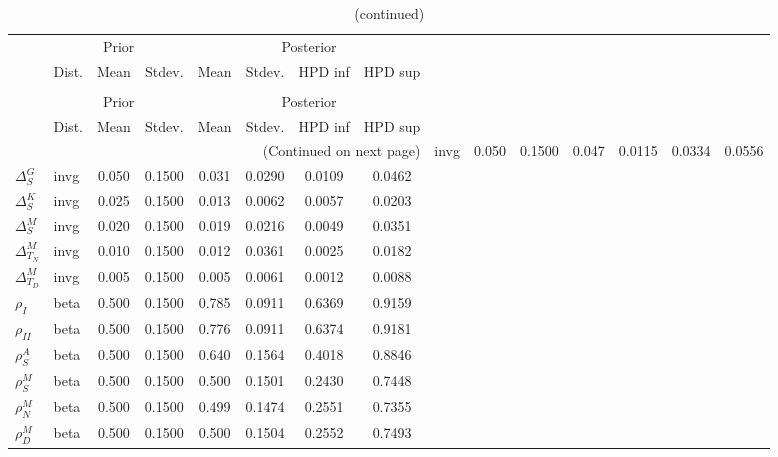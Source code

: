  
\begin{center}
\begin{longtable}{llcccccc} 
\caption{Results from Metropolis-Hastings (parameters)}
 \label{Table:MHPosterior:1}\\
\toprule 
  & \multicolumn{3}{c}{Prior}  &  \multicolumn{4}{c}{Posterior} \\
  \cmidrule(r{.75em}){2-4} \cmidrule(r{.75em}){5-8}
  & Dist. & Mean  & Stdev. & Mean & Stdev. & HPD inf & HPD sup\\
\midrule \endfirsthead 
\caption{(continued)}\\\toprule 
  & \multicolumn{3}{c}{Prior}  &  \multicolumn{4}{c}{Posterior} \\
  \cmidrule(r{.75em}){2-4} \cmidrule(r{.75em}){5-8}
  & Dist. & Mean  & Stdev. & Mean & Stdev. & HPD inf & HPD sup\\
\midrule \endhead 
\bottomrule \multicolumn{8}{r}{(Continued on next page)} \endfoot 
\bottomrule \endlastfoot 
${\Delta^{A}_{S}}$ & invg &   0.050 & 0.1500 &   0.047& 0.0115 &  0.0334 &  0.0556 \\ 
${\Delta^{G}_{S}}$ & invg &   0.050 & 0.1500 &   0.031& 0.0290 &  0.0109 &  0.0462 \\ 
${\Delta^{K}_{S}}$ & invg &   0.025 & 0.1500 &   0.013& 0.0062 &  0.0057 &  0.0203 \\ 
${\Delta^{M}_{S}}$ & invg &   0.020 & 0.1500 &   0.019& 0.0216 &  0.0049 &  0.0351 \\ 
${\Delta^{M}_{T_N}}$ & invg &   0.010 & 0.1500 &   0.012& 0.0361 &  0.0025 &  0.0182 \\ 
${\Delta^{M}_{T_D}}$ & invg &   0.005 & 0.1500 &   0.005& 0.0061 &  0.0012 &  0.0088 \\ 
${\rho_{I}}$ & beta &   0.500 & 0.1500 &   0.785& 0.0911 &  0.6369 &  0.9159 \\ 
${\rho_{II}}$ & beta &   0.500 & 0.1500 &   0.776& 0.0911 &  0.6374 &  0.9181 \\ 
${\rho^{A}_{S}}$ & beta &   0.500 & 0.1500 &   0.640& 0.1564 &  0.4018 &  0.8846 \\ 
${\rho^{M}_{S}}$ & beta &   0.500 & 0.1500 &   0.500& 0.1501 &  0.2430 &  0.7448 \\ 
${\rho^{M}_{N}}$ & beta &   0.500 & 0.1500 &   0.499& 0.1474 &  0.2551 &  0.7355 \\ 
${\rho^{M}_{D}}$ & beta &   0.500 & 0.1500 &   0.500& 0.1504 &  0.2552 &  0.7493 \\ 
\end{longtable}
 \end{center}
